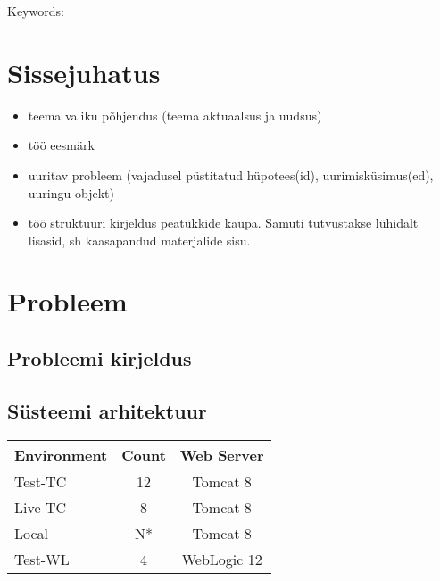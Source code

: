 \documentclass[12pt]{report}
\renewcommand{\headrulewidth}{0pt}
\begin{document}
  Keywords:
  
  \newpage
 
  \tableofcontents
  \fancypagestyle{plain}{%
    \renewcommand{\headrulewidth}{0pt}%
    \fancyhf{}%
    \fancyfoot[R]{\thepage}%
}
 
  \newpage
  
  \section*{Sissejuhatus}
  \label{sissejuhatus}
  
  \begin{itemize}
    \item teema valiku põhjendus (teema aktuaalsus ja uudsus)
    \item töö eesmärk
    \item  uuritav probleem (vajadusel püstitatud hüpotees(id), uurimisküsimus(ed), uuringu objekt)
    \item töö struktuuri kirjeldus peatükkide kaupa. Samuti tutvustakse lühidalt lisasid, sh kaasapandud
materjalide sisu.
  \end{itemize}
  
  \newpage
  
  \section{Probleem}
  
  \subsection{Probleemi kirjeldus}
  
  \subsection{Süsteemi arhitektuur}
  
  \begin{tabular}{|l|c|c|}
    \hline
    Environment & Count & Web Server\\
    \hline
    Test-TC & 12 & Tomcat 8\\
    Live-TC & 8 & Tomcat 8\\
    Local & N* & Tomcat 8\\
    Test-WL & 4 & WebLogic 12\\
    \hline
  \end{tabular}
\end{document}
